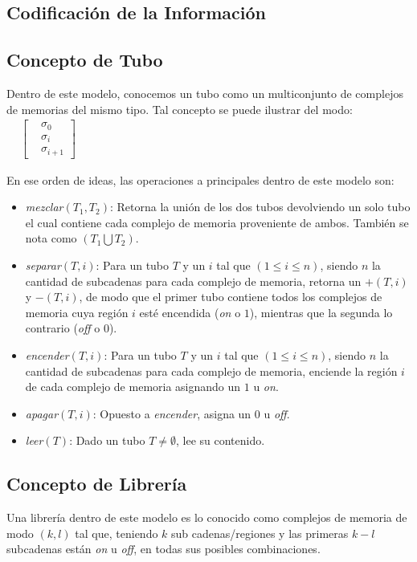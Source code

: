 \documentclass[12pt, letterpaper, twoside]{article}
\begin{document}
    \subsection{Codificación de la Información}

    \subsection{Concepto de Tubo}
    \par Dentro de este modelo, conocemos un tubo como un multiconjunto de complejos de memorias del mismo tipo. Tal concepto se puede ilustrar del modo:
        $
        \begin{aligned}
            &\begin{bmatrix}
                    & \sigma_0 \\
                    & \sigma_i \\
                    & \sigma_{i + 1} 
                \end{bmatrix}
            \end{aligned}
        $
    \par En ese orden de ideas, las operaciones a principales dentro de este modelo son:
    \begin{itemize}
        \item \emph{mezclar}$(T_1,T_2)$: Retorna la unión de los dos tubos devolviendo un solo tubo el cual contiene cada complejo de memoria proveniente de ambos. También se nota como $(T_1\bigcup T_2)$.
        \item \emph{separar}$(T, i)$: Para un tubo $T$ y un $i$ tal que $(1 \leq i \leq n)$, siendo $n$ la cantidad de subcadenas para cada complejo de memoria, retorna un $+(T, i)$ y $-(T, i)$, de modo que el primer tubo contiene todos los complejos de memoria cuya región $i$ esté encendida (\emph{on} o $1$), mientras que la segunda lo contrario (\emph{off} o $0$).
        \item \emph{encender}$(T, i)$: Para un tubo $T$ y un $i$ tal que $(1 \leq i \leq n)$, siendo $n$ la cantidad de subcadenas para cada complejo de memoria, enciende la región $i$ de cada complejo de memoria asignando un $1$ u \emph{on}.
        \item \emph{apagar}$(T, i)$: Opuesto a \emph{encender}, asigna un $0$ u \emph{off}.
        \item \emph{leer}$(T)$: Dado un tubo $T\neq\emptyset$, lee su contenido.
    \end{itemize}
    \subsection{Concepto de Librería}
    \par Una librería dentro de este modelo es lo conocido como complejos de memoria de modo $(k,l)$ tal que, teniendo $k$ sub cadenas/regiones y las primeras $k - l$ subcadenas están \emph{on} u \emph{off}, en todas sus posibles combinaciones.
\end{document}

